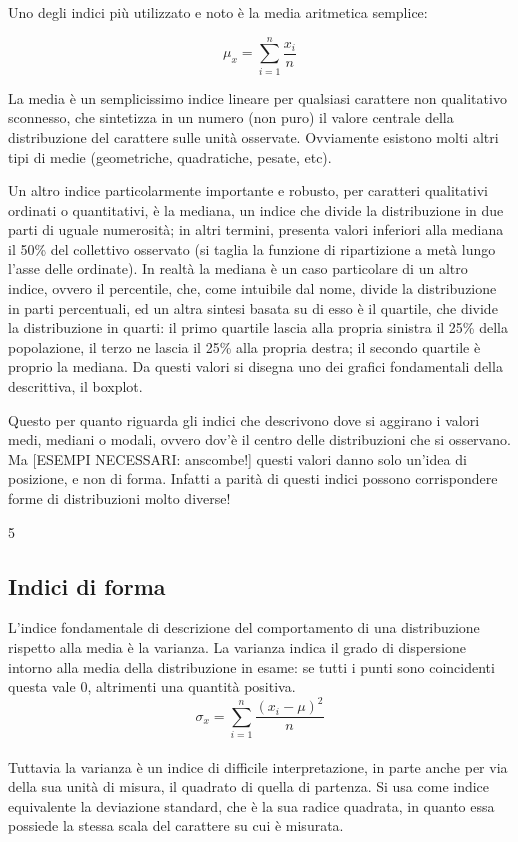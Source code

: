 \documentclass[a4paper]{article}
\begin{document}
Uno degli indici più utilizzato e noto \`{e} la media aritmetica semplice:

\[
  \mu_x=\sum_{i=1}^n\frac{x_i}{n}
\]

La media \`{e} un semplicissimo indice lineare per qualsiasi carattere non qualitativo sconnesso, che sintetizza in un numero (non puro) il valore centrale della distribuzione del carattere sulle unit\`{a} osservate. Ovviamente esistono molti altri tipi di medie (geometriche, quadratiche, pesate, etc).

Un altro indice particolarmente importante e robusto, per caratteri qualitativi ordinati o quantitativi, \`{e} la mediana, un indice che divide la distribuzione in due parti di uguale numerosit\`{a}; in altri termini, presenta valori inferiori alla mediana il 50\% del collettivo osservato (si taglia la funzione di ripartizione a met\`{a} lungo l'asse delle ordinate).
In realt\`{a} la mediana \`{e} un caso particolare di un altro indice, ovvero il percentile, che, come intuibile dal nome, divide la distribuzione in parti percentuali, ed un altra sintesi basata su di esso \`{e} il quartile, che divide la distribuzione in quarti: il primo quartile lascia alla propria sinistra il 25\% della popolazione, il terzo ne lascia il 25\% alla propria destra; il secondo quartile \`{e} proprio la mediana.
Da questi valori si disegna uno dei grafici fondamentali della descrittiva, il boxplot.



Questo per quanto riguarda gli indici che descrivono dove si aggirano i valori medi, mediani o modali, ovvero dov'\`{e} il centro delle distribuzioni che si osservano. Ma [ESEMPI NECESSARI: anscombe!] questi valori danno solo un'idea di posizione, e non di forma. Infatti a parit\`{a} di questi indici possono corrispondere forme di distribuzioni molto diverse!



5~

\subsection{Indici di forma}

L'indice fondamentale di descrizione del comportamento di una distribuzione rispetto alla media \`{e} la varianza.
La varianza indica il grado di dispersione intorno alla media della distribuzione in esame: se tutti i punti sono coincidenti questa vale 0, altrimenti una quantit\`{a} positiva.
\\
\[
 \sigma_x=\sum_{i=1}^n \frac{(x_i - \mu)^2}{n}
\]
\\
Tuttavia la varianza \`{e} un indice di difficile interpretazione, in parte anche per via della sua unit\`{a} di misura, il quadrato di quella di partenza. Si usa come indice equivalente la deviazione standard, che \`{e} la sua radice quadrata, in quanto essa possiede la stessa scala del carattere su cui \`{e} misurata.
\end{document}
